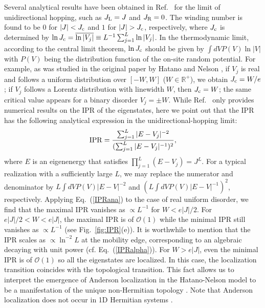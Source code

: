 \documentclass{tADP2e}
\theoremstyle{plain}
\theoremstyle{plain}
\theoremstyle{definition}
\begin{document}
Several analytical results have been obtained in Ref.~\cite{ZG18} for the limit of unidirectional hopping, such as $J_{\rm L}=J$ and $J_{\rm R}=0$. The winding number is found to be $0$ for $|J|<J_{\rm c}$ and $1$ for $|J|>J_{\rm c}$, respectively, where $J_{\rm c}$ is determined by $\ln J_{\rm c}=\overline{\ln |V_j|}\equiv L^{-1}\sum^L_{j=1}\ln |V_j|$. In the thermodynamic limit, according to the central limit theorem, $\ln J_{\rm c}$ should be given by $\int dV P(V)\ln |V|$ with $P(V)$ being the distribution function of the on-site random potential. For example, as was studied in the original paper by Hatano and Nelson \cite{HN96}, if $V_j$ is real and follows a uniform distribution over $[-W,W]$ ($W\in\mathbb{R}^+$), we obtain $J_{\rm c}=W/e$; if $V_j$ follows a Lorentz distribution with linewidth $W$, then $J_{\rm c}=W$; the same critical value appears for a binary disorder $V_j=\pm W$. While Ref.~\cite{ZG18} only provides numerical results on the IPR of the eigenstates, here we point out that the IPR has the following analytical expression %
in the unidirectional-hopping limit:
\begin{equation}
{\rm IPR}=\frac{\sum^L_{j=1}|E-V_j|^{-2}}{(\sum^L_{j=1}|E-V_j|^{-1})^2},
\label{IPRana}
\end{equation} 
where $E$ is an eigenenergy that satisfies $\prod^L_{j=1}(E-V_j)=J^L$. For a typical realization with a sufficiently large $L$, we may replace the numerator and denominator by $L\int dV P(V)|E-V|^{-2}$ and $(L\int dV P(V)|E-V|^{-1})^2$, respectively. Applying Eq.~(\ref{IPRana}) to the case of real uniform disorder, we find that the maximal IPR vanishes as $\propto L^{-1}$ for $W<e|J|/2$. For $e|J|/2<W<e|J|$, the maximal IPR is of $\mathcal{O}(1)$ while the minimal IPR still vanishes as $\propto L^{-1}$ (see Fig.~\ref{fig:IPR}(e)). It is worthwhile to mention that the IPR scales as $\propto \ln^{-2} L$ at the mobility edge, corresponding to an algebraic decaying with unit power (cf. Eq.~(\ref{IPRalpha})). For $W>e|J|$, even the minimal IPR is of $\mathcal{O}(1)$ so all the eigenstates are localized. In this case, the localization transition coincides with the topological transition. This fact allows us to interpret the emergence of Anderson localization in the Hatano-Nelson model to be a manifestation of the unique non-Hermitian topology \cite{ZG18}. Note that Anderson localization does not occur in 1D Hermitian systems \cite{AE79}.
\end{document}
